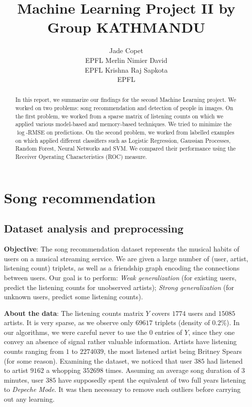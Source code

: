 \documentclass[10pt,a4paper]{article}
\title{Machine Learning Project II by Group KATHMANDU}
\author{
  Jade Copet\\
  EPFL %
  \And
  Merlin Nimier David\\
  EPFL %
  \And
  Krishna Raj Sapkota\\
  EPFL %
}
\begin{document}
\maketitle


\begin{abstract}
  In this report, we summarize our findings for the second Machine Learning project. We worked on two problems: song recommendation and detection of people in images. On the first problem, we worked from a sparse matrix of listening counts on which we applied various model-based and memory-based techniques. We tried to minimize the $\log$-RMSE on predictions. On the second problem, we worked from labelled examples on which applied different classifiers such as Logistic Regression, Gaussian Processes, Random Forest, Neural Networks and SVM. We compared their performance using the Receiver Operating Characteristics (ROC) measure.
\end{abstract}

\section{Song recommendation}

  \subsection{Dataset analysis and preprocessing}
  \textbf{Objective}: The song recommendation dataset represents the musical habits of users on a musical streaming service. We are given a large number of (user, artist, listening count) triplets, as well as a friendship graph encoding the connections between users. Our goal is to perform: \textit{Weak generalization} (for existing users, predict the listening counts for unobserved artists); \textit{Strong generalization} (for unknown users, predict some listening counts).

  \textbf{About the data}: The listening counts matrix $Y$ covers $1774$ users and $15085$ artists. It is very sparse, as we observe only $69617$ triplets (density of $0.2\%$). In our algorithms, we were careful never to use the $0$ entries of $Y$, since they one convey an absence of signal rather valuable information. Artists have listening counts ranging from $1$ to $2274039$, the most listened artist being Britney Spears (for some reason). Examining the dataset, we noticed that user $385$ had listened to artist $9162$ a whopping $352698$ times. Assuming an average song duration of $3$ minutes, user $385$ have supposedly spent the equivalent of two full years listening to \textit{Depeche Mode}. It was then necessary to remove such outliers before carrying out any learning.
\end{document}
